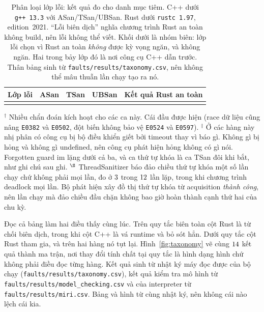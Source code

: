 \begin{table}[H]
\centering
\small
\caption[Phân loại lớp lỗi: kết quả đo]{Phân loại lớp lỗi: kết quả đo cho danh mục tiêm. C++ dưới
\texttt{g++~13.3} với ASan/TSan/UBSan. Rust dưới \texttt{rustc~1.97}, edition~2021. ``Lỗi
biên dịch'' nghĩa chương trình Rust an toàn không build, nên lỗi không thể viết. Khối
dưới là nhóm biên: lớp lỗi chọn vì Rust an toàn \emph{không} được kỳ vọng
ngăn, và không ngăn. Hai trong bảy lớp đó là nơi công cụ C++ dẫn trước.
Thân bảng sinh từ \texttt{faults/results/taxonomy.csv}, nên không thể
mâu thuẫn lần chạy tạo ra nó.\label{tab:taxonomy}}
\footnotesize
\setlength{\tabcolsep}{4pt}
\begin{tabular}{@{}l l l l l@{}}
\hline\hline
Lớp lỗi & ASan & TSan & UBSan & Kết quả Rust an toàn \\
\hline
\\
\hline
\end{tabular}

\vspace{0.4em}
{\footnotesize\raggedright
$^{\dagger}$ Nhiều chẩn đoán kích hoạt cho các ca này. Cái đầu được hiện (race dữ liệu cũng
nâng \texttt{E0382} và \texttt{E0502}, đột biến không bảo vệ \texttt{E0524} và
\texttt{E0597}). \quad
$^{\ddagger}$ Ở các hàng này nhị phân có công cụ bị bộ điều khiển giết bởi timeout thay
vì báo gì. Không gì bị hỏng và không gì undefined, nên công cụ
phát hiện hỏng không có gì nói. Forgotten guard im lặng dưới cả ba, và
ca thứ tự khóa là ca TSan đôi khi bắt, như ghi chú sau ghi. \quad
$^{\S}$ ThreadSanitizer báo đảo chiều thứ tự khóa một số lần chạy chứ không phải mọi lần, đo ở
$3$ trong $12$ lần lặp, trong khi chương trình deadlock
mọi lần. Bộ phát hiện xây đồ thị thứ tự khóa từ acquisition \emph{thành công}, nên lần chạy mà đảo chiều đầu chặn không bao giờ hoàn thành cạnh thứ hai của chu kỳ.\par}
\end{table}

Đọc cả bảng làm hai điều thấy cùng lúc. Trên quy tắc biên toàn cột Rust
là từ chối biên dịch, trong khi cột C++ là vá runtime
và bỏ sót hẳn. Dưới quy tắc cột Rust tham gia, và trên hai hàng nó
tụt lại. Hình~\ref{fig:taxonomy} vẽ cùng $14$ kết quả thành ma trận,
nơi
thay đổi tính chất tại quy tắc là hình dạng hình chứ không phải điều đọc từng
hàng. Kết quả sinh từ nhật ký máy đọc được của bộ chạy
(\texttt{faults/results/taxonomy.csv}), kết quả kiểm tra mô hình từ
\texttt{faults/results/model\_checking.csv} và của interpreter từ
\texttt{faults/results/miri.csv}. Bảng và hình từ cùng nhật ký, nên không
cái nào lệch cái kia.


